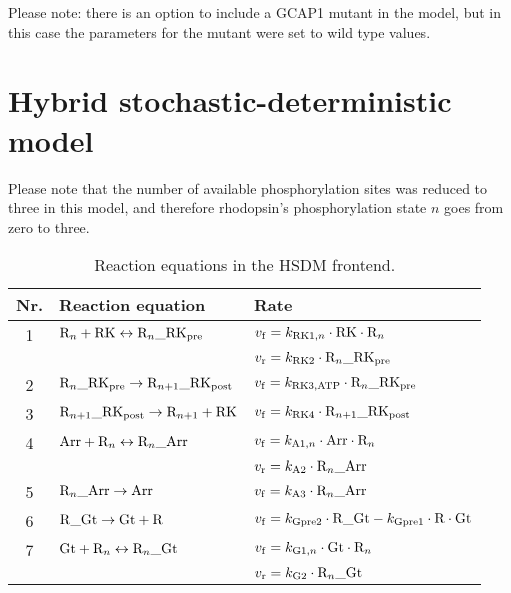 \documentclass[a4paper, 12pt]{book}
\begin{document}
Please note: there is an option to include a GCAP1 mutant in the model, but in this case the parameters for the mutant were set to wild type values.

\section*{Hybrid stochastic-deterministic model}
\label{sec_appendix_small}
Please note that the number of available phosphorylation sites was reduced to three in this model, and therefore rhodopsin's phosphorylation state $n$ goes from zero to three.\\

\begin{table}[H]
\centering
\caption{Reaction equations in the HSDM frontend.}
\begin{tabular}{c | l | l}
Nr. & Reaction equation & Rate \\
\hline
\hline
1 & ${\rm R}_n + {\rm RK} \leftrightarrow {\rm R}_n\_{\rm RK}_{\rm pre}$ & $v_{\rm f} = k_{{\rm RK1,}n} \cdot {\rm RK} \cdot {\rm R}_n$\\
 & & $v_{\rm r} =  k_{\rm RK2} \cdot {\rm R}_n\_{\rm RK}_{\rm pre} $\\
\hline
2 & ${\rm R}_n\_{\rm RK}_{\rm pre} \rightarrow {\rm R}_{n+1}\_{\rm RK}_{\rm post}$ & $v_{\rm f} =  k_{\rm RK3,ATP} \cdot {\rm R}_n\_{\rm RK}_{\rm pre} $\\
\hline
3 & ${\rm R}_{n+1}\_{\rm RK}_{\rm post} \rightarrow {\rm R}_{n+1} + {\rm RK}$ & $v_{\rm f} =  k_{\rm RK4} \cdot {\rm R}_{n+1}\_{\rm RK}_{\rm post} $\\
\hline
4 & ${\rm Arr} + {\rm R}_n \leftrightarrow {\rm R}_n\_{\rm Arr}$ & $v_{\rm f} = k_{{\rm A1,}n} \cdot {\rm Arr} \cdot {\rm R}_n $\\
 & & $v_{\rm r} = k_{\rm A2} \cdot {\rm R}_n\_{\rm Arr} $\\
\hline
5 & ${\rm R}_n\_{\rm Arr} \rightarrow {\rm Arr}$ & $v_{\rm f} =  k_{\rm A3} \cdot {\rm R}_n\_{\rm Arr} $\\
\hline
6 & ${\rm R}\_{\rm Gt} \rightarrow {\rm Gt} + {\rm R}$ & $v_{\rm f} =  k_{\rm Gpre2} \cdot {\rm R}\_{\rm Gt} - k_{\rm Gpre1} \cdot {\rm R} \cdot {\rm Gt} $\\
\hline
7 & ${\rm Gt} + {\rm R}_n \leftrightarrow {\rm R}_n\_{\rm Gt}$ & $v_{\rm f} = k_{{\rm G1,}n} \cdot {\rm Gt} \cdot {\rm R}_n $\\
 & & $v_{\rm r} = k_{\rm G2} \cdot {\rm R}_n\_{\rm Gt}$\\
\hline

\end{tabular}
\end{table}
\end{document}
